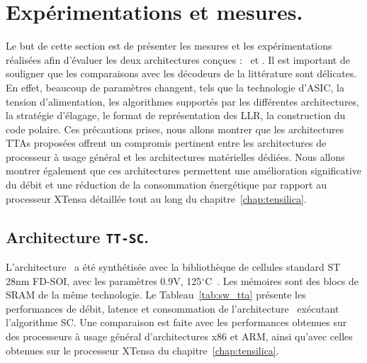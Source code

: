 \section{Expérimentations et mesures.}
Le but de cette section est de présenter les mesures et les expérimentations réalisées afin d'évaluer les deux architectures conçues : \TTSC~et \TTSCAN. Il est important de souligner que les comparaisons avec les décodeurs de la littérature sont délicates. En effet, beaucoup de paramètres changent, tels que la technologie d'ASIC, la tension d'alimentation, les algorithmes supportés par les différentes architectures, la stratégie d'élagage, le format de représentation des LLR, la construction du code polaire. Ces précautions prises, nous allons montrer que les architectures TTAs proposées offrent un compromis pertinent entre les architectures de processeur à usage général et les architectures matérielles dédiées. Nous allons montrer également que ces architectures permettent une amélioration significative du débit et une réduction de la consommation énergétique par rapport au processeur XTensa détaillée tout au long du chapitre~\ref{chap:tensilica}.

\subsection{Architecture \texttt{TT-SC}.}
\label{sec:tta_res}

L'architecture \TTSC~a été synthétisée avec la bibliothèque de cellules standard ST 28nm FD-SOI, avec les paramètres 0.9V, 125$^{\circ}$C~\cite{st_fdsoi_2015}. Les mémoires sont des blocs de SRAM de la même technologie. Le Tableau~\ref{tab:sw_tta} présente les performances de débit, latence et consommation de l'architecture \TTSC~exécutant l'algorithme SC. Une comparaison est faite avec les performances obtenues sur des processeurs à usage général d'architectures x86 et ARM, ainsi qu'avec celles obtenues sur le processeur XTensa du chapitre~\ref{chap:tensilica}.


